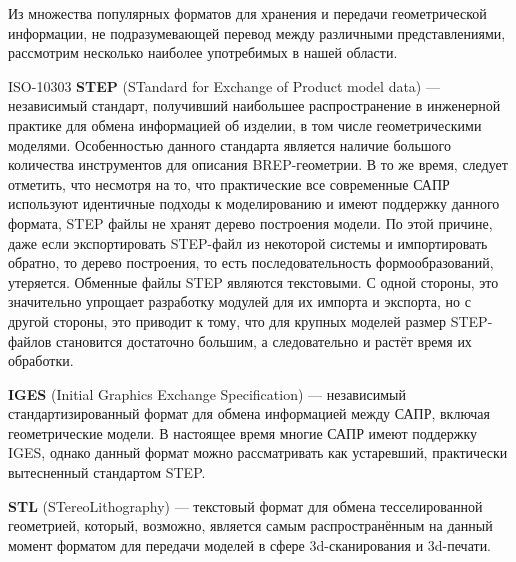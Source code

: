 Из множества популярных форматов для хранения и передачи геометрической информации, не подразумевающей перевод между различными представлениями, рассмотрим несколько наиболее употребимых в нашей области.


ISO-10303 \textbf{STEP} (STandard for Exchange of Product model data) --- независимый стандарт, получивший наибольшее распространение в инженерной практике для обмена информацией об изделии, в том числе геометрическими моделями.
Особенностью данного стандарта является наличие большого количества инструментов для описания BREP-геометрии. В то же время, следует отметить, что несмотря на то, что практические все современные САПР используют идентичные подходы к моделированию и имеют поддержку данного формата, STEP файлы не хранят дерево построения модели. По этой причине, даже если экспортировать STEP-файл из некоторой системы и импортировать обратно, то дерево построения, то есть последовательность формообразований, утеряется.
Обменные файлы STEP являются текстовыми. С одной стороны, это значительно упрощает разработку модулей для их импорта и экспорта, но с другой стороны, это приводит к тому, что для крупных моделей размер STEP-файлов становится достаточно большим, а следовательно и растёт время их обработки.


\textbf{IGES} (Initial Graphics Exchange Specification) --- независимый стандартизированный формат для обмена информацией между САПР, включая геометрические модели. В настоящее время многие САПР имеют поддержку IGES, однако данный формат можно рассматривать как устаревший, практически вытесненный стандартом STEP.


\textbf{STL} (STereoLithography) --- текстовый формат для обмена тесселированной геометрией, который, возможно, является самым распространённым на данный момент форматом для передачи моделей в сфере 3d-сканирования и 3d-печати.

